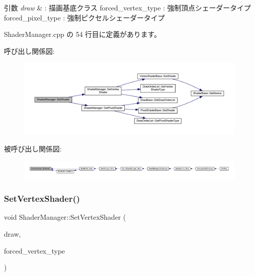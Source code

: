 \begin{DoxyParams}{引数}
{\em draw} & \+: 描画基底クラス forced\+\_\+vertex\+\_\+type \+: 強制頂点シェーダータイプ forced\+\_\+pixel\+\_\+type \+: 強制ピクセルシェーダータイプ \\
\hline
\end{DoxyParams}


 Shader\+Manager.\+cpp の 54 行目に定義があります。

呼び出し関係図\+:
\nopagebreak
\begin{figure}[H]
\begin{center}
\leavevmode
\includegraphics[width=350pt]{class_shader_manager_ad2caed4ae50c1ca784151d0f9e50c381_cgraph}
\end{center}
\end{figure}
被呼び出し関係図\+:
\nopagebreak
\begin{figure}[H]
\begin{center}
\leavevmode
\includegraphics[width=350pt]{class_shader_manager_ad2caed4ae50c1ca784151d0f9e50c381_icgraph}
\end{center}
\end{figure}
\mbox{\label{class_shader_manager_a3661a079ae4e9e7e4d5da35f2171b41e}} 
\subsubsection{\texorpdfstring{Set\+Vertex\+Shader()}{SetVertexShader()}}
{\footnotesize\ttfamily void Shader\+Manager\+::\+Set\+Vertex\+Shader (\begin{DoxyParamCaption}\item[{\mbox{\hyperlink{class_draw_base}{Draw\+Base}} $\ast$}]{draw,  }\item[{\mbox{\hyperlink{class_shader_manager_a9b51e49d70eb3cc58f6d1f3994e8cfbd}{Vertex\+Shader\+Type}}}]{forced\+\_\+vertex\+\_\+type }\end{DoxyParamCaption})\hspace{0.3cm}{\ttfamily [private]}}



